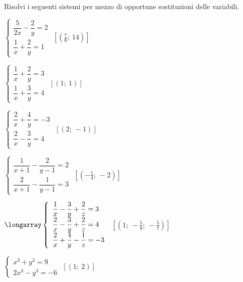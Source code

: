 \begin{esercizio}[\Ast]
 \label{ese:22.65}
 Risolvi i seguenti sistemi per mezzo di opportune sostituzioni delle variabili.
\begin{multicols}{2}
\begin{enumeratea}
{\longarray
\item \(\left\{\begin{array}{l}
\dfrac{5}{2x}-\dfrac{2}{y}=2\\\dfrac{1}{x}+\dfrac{2}{y}=1
\end{array}\right.\)
\hfill \(\left[\left(\frac{7}{6};~14\right)\right]\)
\item \(\left\{\begin{array}{l}
\dfrac{1}{x}+\dfrac{2}{y}=3\\\dfrac{1}{x}+\dfrac{3}{y}=4
\end{array}\right.\)
\hfill \(\left[\left(1;~1\right)\right]\)
\item \(\left\{\begin{array}{l}
\dfrac{2}{x}+\dfrac{4}{y}=-3\\\dfrac{2}{x}-\dfrac{3}{y}=4 
\end{array}\right.\)
\hfill \(\left[\left(2;~-1\right)\right]\)
\item \(\left\{\begin{array}{l}
\dfrac{1}{x+1}-\dfrac{2}{y-1}=2\\\dfrac{2}{x+1}-\dfrac{1}{y-1}=3
\end{array}\right.\)
\hfill \(\left[\left(-{\frac{1}{4}};~-2\right)\right]\)}
% 
\item \(\longarray\left\{\begin{array}{l}
\dfrac{1}{x}-\dfrac{3}{y}+\dfrac{2}{z}=3 \\
\dfrac{2}{x}-\dfrac{3}{y}+\dfrac{2}{z}=4 \\
\dfrac{2}{x}+\dfrac{4}{y}-\dfrac{1}{z}=-3
\end{array}\right.\)
\hfill \(\left[\left(1;~-\frac{5}{8};~-\frac{5}{7}\right)\right]\)
\item \(\left\{\begin{array}{l}
x^{3}+y^{3}=9 \\2x^{3}-y^{3}=-6 
\end{array}\right.\)
\hfill \(\left[(1;~2)\right]\)
\end{enumeratea}
\end{multicols}
\end{esercizio}

